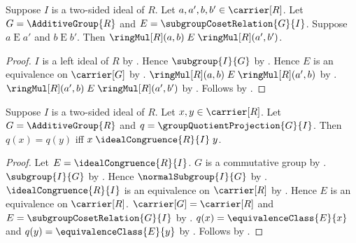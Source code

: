 \begin{theorem}\label{ideal_coset_relation_multiplication_congruent}
    Suppose $I$ is a two-sided ideal of $R$.
    Let $a,a',b,b'\in\carrier[R]$.
    Let $G=\AdditiveGroup{R}$ and $E=\subgroupCosetRelation{G}{I}$.
    Suppose $a\mathrel{E}a'$ and $b\mathrel{E}b'$.
    Then $\ringMul[R](a,b)\mathrel{E}\ringMul[R](a',b')$.
\end{theorem}
\begin{proof}
    $I$ is a left ideal of $R$ by .
    Hence $\subgroup{I}{G}$ by .
    Hence $E$ is an equivalence on $\carrier[G]$ by
        .
    $\ringMul[R](a,b)\mathrel{E}\ringMul[R](a',b)$ by
        .
    $\ringMul[R](a',b)\mathrel{E}\ringMul[R](a',b')$ by
        .
    Follows by .
\end{proof}

\begin{theorem}\label{ideal_congruence_quotient_projection_eq_iff}
    Suppose $I$ is a two-sided ideal of $R$.
    Let $x,y\in\carrier[R]$.
    Let $G=\AdditiveGroup{R}$ and
        $q=\groupQuotientProjection{G}{I}$.
    Then $q(x)=q(y)$ iff $x\mathrel{\idealCongruence{R}{I}}y$.
\end{theorem}
\begin{proof}
    Let $E=\idealCongruence{R}{I}$.
    $G$ is a commutative group by
        .
    $\subgroup{I}{G}$ by
        .
    Hence $\normalSubgroup{I}{G}$ by
        .
    $\idealCongruence{R}{I}$ is an equivalence on $\carrier[R]$ by
        .
    Hence $E$ is an equivalence on $\carrier[R]$.
    $\carrier[G]=\carrier[R]$ and
        $E=\subgroupCosetRelation{G}{I}$ by
        .
    $q(x)=\equivalenceClass{E}{x}$ and
        $q(y)=\equivalenceClass{E}{y}$ by
        .
    Follows by .
\end{proof}
